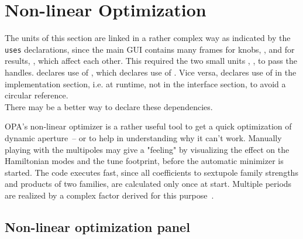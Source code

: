 \documentclass[12pt]{article}
\newcommand\code[1]{{\tt #1}}
\newcommand{\opagui}[1]{\colorbox{blue!20}{{\color{black}\code{#1}}}}
\newcommand{\oguih}[2]{\subsection{\label{#2}#1}{\Huge\opagui{#2}}\\}
\newcommand{\ogui}[1]{\hyperref[#1]{\opagui{#1}}}
\newcommand{\opaguif}[1]{\colorbox{violet!30}{{\color{black}\code{#1}}}}
\newcommand{\oguif}[1]{\hyperref[#1]{\opaguif{#1}}}
\newcommand{\opauni}[1]{\colorbox{orange!30}{{\color{black}\code{#1}}}}
\newcommand{\ouni}[1]{\hyperref[#1]{\opauni{#1}}}
\newcommand{\todo}[1]{{\color{red} #1}}
\newcommand{\feature}[1]{{\color{cadmiumgreen} #1}}
\begin{document}
\section{\label{secnonl}Non-linear Optimization}

The units of this section are linked in a rather complex way as indicated by the \code{uses} declarations, since the main GUI \ogui{opachroma} contains many frames for knobs, \oguif{csexframe}, and for results, \oguif{chamframe}, which affect each other. This required the two small units \ouni{chromreslib}, \ouni{chromreslib}, to pass the handles. \oguif{csexframe} declares use of \ouni{chromreslib}, which declares use of \oguif{chamframe}. Vice versa,
\oguif{chamframe} declares use of \oguif{csexframe} in the implementation section, i.e. at runtime, not in the interface section, to avoid a circular reference. \\
\todo{There may be a better way to declare these dependencies.}

\feature{OPA's non-linear optimizer is a rather useful tool to get a quick optimization of dynamic aperture~-- or to help in understanding why it can't work. Manually playing with the multipoles may give a "feeling" by visualizing the effect on the Hamiltonian modes and the tune footprint, before the automatic minimizer is started. The code executes fast, since all coefficients to sextupole family strengths and products of two families, are calculated only once at start. Multiple periods are realized by a complex factor derived for this purpose~\cite{inside}.}

\oguih{Non-linear optimization panel}{opachroma} 
\end{document}
